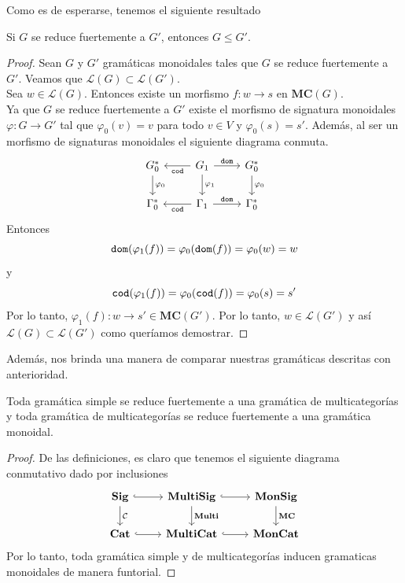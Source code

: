 \documentclass[../main.tex]{subfiles}
\begin{document}
	\noindent Como es de esperarse, tenemos el siguiente resultado
	
	\begin{prop}
		Si $G$ se reduce fuertemente a $G'$, entonces $G\leq G'$.
	\end{prop}
	\begin{proof}
		Sean $G$ y $G'$ gramáticas monoidales tales que $G$ se reduce fuertemente a $G'$. Veamos que $\mathcal{L}(G) \subset \mathcal{L}(G')$.\\
		Sea $w \in \mathcal{L}(G)$. Entonces existe un morfismo $f:w \to s$ en $\textbf{MC}(G)$.\\
		Ya que $G$ se reduce fuertemente a $G'$ existe el morfismo de signatura monoidales $\varphi: G \to G'$ tal que $\varphi_0(v)=v$ para todo $v \in V$ y $\varphi_0(s)=s'$. Además, al ser un morfismo de signaturas monoidales el siguiente diagrama conmuta.
		\[
		\begin{tikzcd}
			G_0^* \arrow{d}{\phi_0} & G_1 \arrow{r}{\tt{dom}} \arrow{l}{\tt{cod}} \arrow{d}{\phi_1} & G_0^* \arrow{d}{\phi_0} \\
			\Gamma_0^* & \Gamma_1 \arrow{r}{\tt{dom}} \arrow{l}{\tt{cod}} & \Gamma_0^*
		\end{tikzcd}
		\]
		Entonces
		$${\tt{dom}}(\varphi_1(f))=\varphi_0({\tt{dom}}(f))=\varphi_0(w)=w$$
		y 
		$${\tt{cod}}(\varphi_1(f))=\varphi_0({\tt{cod}}(f))=\varphi_0(s)=s'$$
		Por lo tanto, $\varphi_1(f):w \to s' \in \textbf{MC}(G')$. Por lo tanto, $w \in \mathcal{L}(G')$ y así $\mathcal{L}(G) \subset \mathcal{L}(G')$ como queríamos demostrar. 
	\end{proof}

    Además, nos brinda una manera de comparar nuestras gramáticas descritas con anterioridad. 

    \begin{prop}
        Toda gramática simple se reduce fuertemente a una gramática de multicategorías y toda gramática de multicategorías se reduce fuertemente a una gramática monoidal.
    \end{prop}

    \begin{proof}
        De las definiciones, es claro que tenemos el siguiente diagrama conmutativo dado por inclusiones 
        \[
        \begin{tikzcd}
            \textbf{Sig} \arrow[hook]{r}{} \arrow{d}{\mathcal{C}} & \textbf{MultiSig} \arrow[hook]{r}{} \arrow{d}{\textbf{Multi}} & \textbf{MonSig} \arrow{d}{\textbf{MC}}  \\
            \textbf{Cat} \arrow[hook]{r}{} & \textbf{MultiCat} \arrow[hook]{r}{} & \textbf{MonCat} 
        \end{tikzcd}
        \]
        Por lo tanto, toda gramática simple y de multicategorías inducen gramaticas monoidales de manera funtorial. 
    \end{proof}
    
\end{document}
